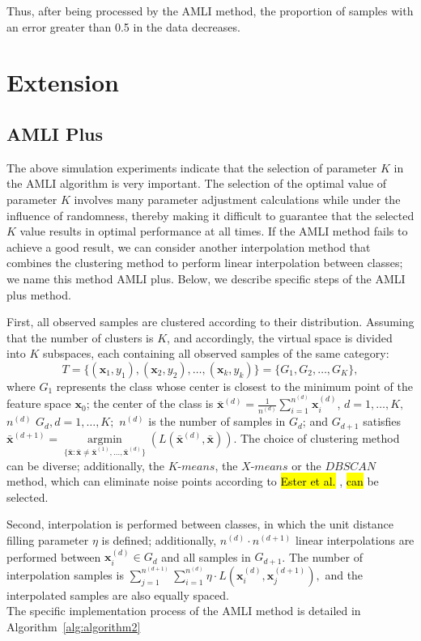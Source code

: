 \documentclass[mathematics,article,accept,pdftex,moreauthors]{Definitions/mdpi}
\begin{document}
Thus, after being processed by the AMLI method, the proportion of samples with an error greater than 0.5 in the data decreases.
\section{ Extension}

\subsection{ AMLI Plus}

The above simulation experiments indicate that the selection of parameter $K$ in the AMLI algorithm is very important. The selection of the optimal value of parameter $K$ involves many parameter adjustment calculations while under the influence of randomness, thereby making it difficult to guarantee that the selected $K$ value results in optimal performance at all times. If the AMLI method fails to achieve a good result, we can consider another interpolation method that combines the clustering method to perform linear interpolation between classes; we name this method AMLI plus. Below, we describe specific steps of the AMLI plus method.

First, all observed samples are clustered according to their distribution. Assuming that the number of clusters is $K$, and accordingly, the virtual space is divided into $K$ subspaces, each containing all observed samples of the same category:
$$ T = \{(\bm{x}_{1}, y_{1}), (\bm{x}_{2}, y_{2}), \ldots, (\bm{x}_{k}, y_{k})\} = \{G_{1}, G_{2}, \ldots, G_{K}\},$$
where $G_{1}$ represents the class whose center is closest to the minimum point of the feature space $\bm{x}_{0}$; the center of the class is $\bar{\bm{x}}^{(d)}=\displaystyle{\frac{1}{n^{(d)}}}\sum_{i=1}^{n^{(d)}}\bm{x}_{i}^{(d)}$, $d=1,\ldots,K,$ $n^{(d)}$ $G_{d} , d = 1,\ldots,K;$ $n^{(d)}$ is the number of samples in $G_{d}$; and $G_{d+1}$ satisfies $\bar{\bm{x}}^{(d+1)} = \mathop{argmin}\limits_{\{\bar{\bm{x}}:\bar{\bm{x}} \neq \bar{\bm{x}}^{(1)}, \ldots, \bar{\bm{x}}^{(d)} \}} (L(\bar{\bm{x}}^{(d)}, \bar{\bm{x}})) $. The choice of clustering method can be diverse; additionally, the $K$-$means$, the $X$-$means$ or the $DBSCAN$ method, which can eliminate noise points according to \hl{Ester et al.} \cite{ref15}, \hl{can} be selected.


Second, interpolation is performed between classes, in which the unit distance filling parameter $\eta$ is defined; additionally, $n^{(d)} \cdot n^{(d+1)}$  linear interpolations are performed between $\bm{x}_{i}^{(d)} \in G_{d}$ and all samples in $G_{d+1}$. The number of interpolation samples is $\sum_{j=1}^{n^{(d+1)}} \sum_{i=1}^{n^{(d)}} \eta \cdot L(\bm{x}_{i}^{(d)}, \bm{x}_{j}^{(d+1)}),$ and the interpolated samples are also equally spaced.\\The specific implementation process of the AMLI method is detailed in Algorithm~\ref{alg:algorithm2}
\vspace{6pt}
\end{document}

